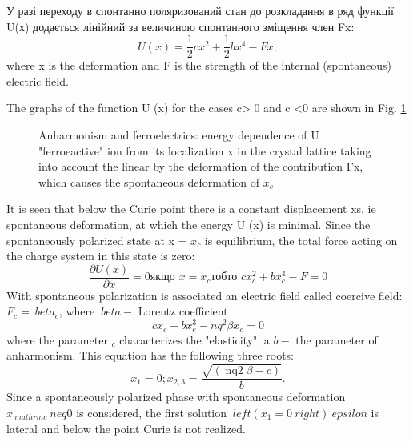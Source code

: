 \documentclass[a4paper,14pt]{extreport}
\begin{document}
У разі переходу в спонтанно поляризований стан до розкладання в ряд функції U(х) додається лінійний за величиною спонтанного зміщення член Fx:
\begin{equation}
U(x)  = \dfrac{1}{2} cx^2 + \dfrac{1}{2} bx^4 -Fx,
\label{eq2}
\end{equation}
where x is the deformation and F is the strength of the internal (spontaneous) electric field.

The graphs of the function U (x) for the cases c> 0 and c <0 are shown in Fig.
\ref{ris2}



\begin{figure}[h]
\caption{Anharmonism and ferroelectrics: energy dependence of U "ferroeactive"
  ion from its localization x in the crystal lattice taking into account the linear
by the deformation of the contribution Fx, which causes the spontaneous deformation of $ x_c $}
\label{ris2}
\end{figure}




It is seen that below the Curie point there is a constant displacement xs, ie spontaneous deformation, at which the energy U (x) is minimal. Since the spontaneously polarized state at x = $ x_c $ is equilibrium, the total force acting on the charge system in this state is zero:
\begin{equation}
\dfrac{\partial U(x)}{\partial x}  =  0 \text{якщо } x = x_{c} \text{тобто } cx_{c}^2 + bx_{c}^4 - F = 0
\end{equation}
With spontaneous polarization is associated an electric field called
coercive field: $ F_ {c} = \ beta_ {c} $, where $ \ beta- $ Lorentz coefficient
$$
c x_{c}+b x_{c}^{3}-n q^{2} \beta x_{c}=0
$$
where the parameter $ _ {c} $ characterizes the "elasticity", a $ b- $ the parameter of anharmonism. This equation has the following three roots:
\begin{equation}
x_{1}=0 ; x_{2,3}= \dfrac{\sqrt{(\operatorname{nq2} \beta-c)}}{b}.
\label{eq3}
\end{equation}
Since a spontaneously polarized phase with spontaneous deformation $ x _ {\ mathrm {c}} \ neq 0 $ is considered, the first solution {} $ \ left (x_ {1} = 0 \ right) \ epsilon $ is lateral and below the point Curie is not realized.
\end{document}
